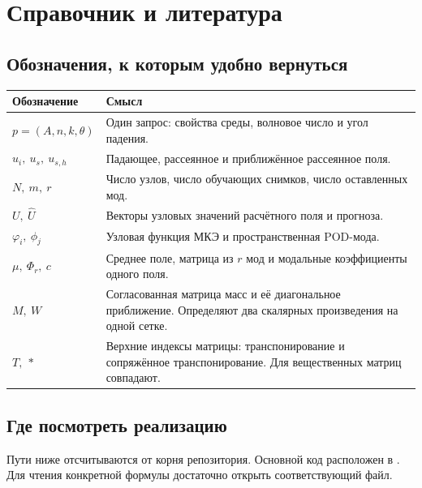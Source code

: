\chapter{Справочник и литература}
\label{sources:chapter}

\section{Обозначения, к которым удобно вернуться}
\begin{center}
\renewcommand{\arraystretch}{1.18}
\begin{tabularx}{\linewidth}{@{}l X@{}}
\toprule
Обозначение & Смысл \\ \midrule
$p=(A,n,k,\theta)$ & Один запрос: свойства среды, волновое число и угол падения.\\
$u_i,\ u_s,\ u_{s,h}$ & Падающее, рассеянное и приближённое рассеянное поля.\\
$N,\ m,\ r$ & Число узлов, число обучающих снимков, число оставленных мод.\\
$U,\ \widehat U$ & Векторы узловых значений расчётного поля и прогноза.\\
$\varphi_i,\ \phi_j$ & Узловая функция МКЭ и пространственная POD-мода.\\
$\mu,\ \Phi_r,\ c$ & Среднее поле, матрица из $r$ мод и модальные коэффициенты одного поля.\\
$M,\ W$ & Согласованная матрица масс и её диагональное приближение. Определяют два скалярных произведения на одной сетке.\\
$T,\ *$ & Верхние индексы матрицы: транспонирование и сопряжённое транспонирование. Для вещественных матриц совпадают.\\
\bottomrule
\end{tabularx}
\end{center}

\section{Где посмотреть реализацию}
Пути ниже отсчитываются от корня репозитория. Основной код расположен
в . Для чтения конкретной формулы достаточно
открыть соответствующий файл.

